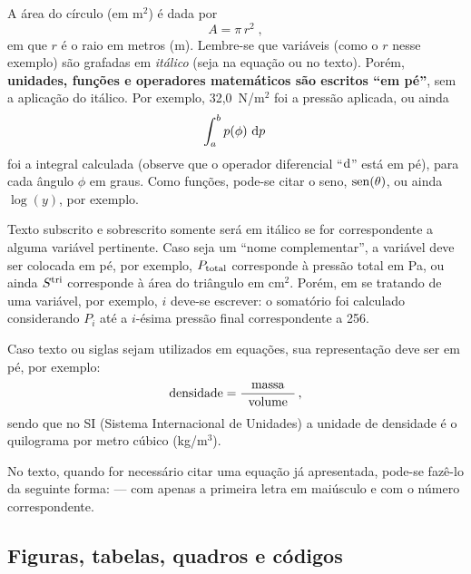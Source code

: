 A área do círculo (em m$^2$) é dada por 
\begin{equation}
	A = \pi \, r^2\;,
\label{eq:area-circ}
\end{equation}
%
em que $r$ é o raio em metros (m). Lembre-se que variáveis (como o $r$ nesse exemplo) são grafadas em \textit{itálico} (seja na equação ou no texto). Porém, \textbf{unidades, funções e operadores matemáticos são escritos ``em pé''}, sem a aplicação do itálico. Por exemplo, 32,0~N/m$^2$ foi a pressão aplicada, ou ainda
%
\begin{equation}
	\int_a^b p(\phi)\, \operatorname{d\!} p\,
\label{eq:int}
\end{equation}
%
foi a integral calculada (observe que o operador diferencial ``$\text{d}$'' está em pé), para cada ângulo $\phi$ em graus. Como funções, pode-se citar o seno, $\operatorname{sen}(\theta)$, ou ainda $\log(y)$, por exemplo. 
%

Texto subscrito e sobrescrito somente será em itálico se for correspondente a alguma variável pertinente. Caso seja um ``nome complementar'', a variável deve ser colocada em pé, por exemplo, $P_{\text{total}}$ corresponde à pressão total em Pa, ou ainda $S^{\text{tri}}$ corresponde à área do triângulo em cm$^2$. Porém, em se tratando de uma variável, por exemplo, $i$ deve-se escrever: o somatório foi calculado considerando $P_i$ até a $i$-ésima pressão final correspondente a 256.

Caso texto ou siglas sejam utilizados em equações, sua representação deve ser em pé, por exemplo:
%
\begin{equation}
	\text{densidade} = \frac{\text{massa}}{\;\;\text{volume}\;\;}\,,
\label{eq:densidade}
\end{equation}
%
sendo que no SI (Sistema Internacional de Unidades) a unidade de densidade é o quilograma por metro cúbico (kg/m$^3$).
%

No texto, quando for necessário citar uma equação já apresentada, pode-se fazê-lo da seguinte forma:  --- com apenas a primeira letra em maiúsculo e com o número correspondente.

\subsection{Figuras, tabelas, quadros e códigos}

